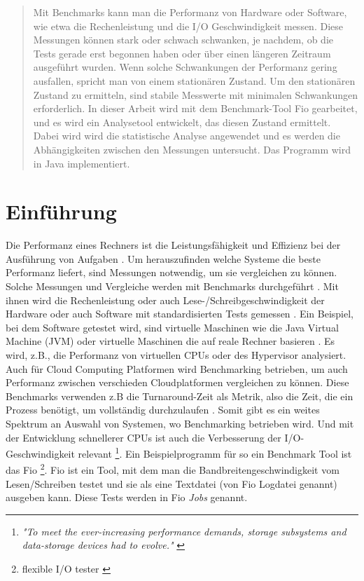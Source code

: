 \documentclass{article}
\begin{document}
\begin{abstract}
Mit Benchmarks kann man die Performanz von Hardware oder Software, wie etwa die Rechenleistung und die I/O Geschwindigkeit messen. 
Diese Messungen können stark oder schwach schwanken, je nachdem, ob die Tests gerade erst begonnen haben oder über einen längeren Zeitraum ausgeführt wurden.
Wenn solche Schwankungen der Performanz gering ausfallen, spricht man von einem stationären Zustand.
Um den stationären Zustand zu ermitteln, sind stabile Messwerte mit minimalen Schwankungen erforderlich. In dieser Arbeit wird mit dem Benchmark-Tool Fio gearbeitet, und es wird ein Analysetool entwickelt, das diesen Zustand ermittelt. Dabei wird wird die statistische Analyse angewendet und es werden die Abhängigkeiten zwischen den Messungen untersucht. Das Programm wird in Java implementiert.
\end{abstract}

\newpage
\section{Einführung}
Die Performanz eines Rechners ist die Leistungsfähigkeit und Effizienz bei der Ausführung von Aufgaben \cite{Delst}. Um herauszufinden welche Systeme die beste Performanz liefert, sind Messungen notwendig, um sie vergleichen zu können. Solche Messungen und Vergleiche werden mit Benchmarks durchgeführt \cite{Sabetta2008}.
Mit ihnen wird die Rechenleistung oder auch Lese-/Schreibgeschwindigkeit der Hardware oder auch Software mit standardisierten Tests gemessen \cite{benchmarkingBruno2014}. Ein Beispiel, bei dem Software getestet wird, sind virtuelle Maschinen wie die Java Virtual Machine (JVM) \cite{10.1145/1297027.1297033} oder virtuelle Maschinen die auf reale Rechner basieren \cite{9256518}.
Es wird, z.B., die Performanz von virtuellen CPUs oder des Hypervisor analysiert.
Auch für Cloud Computing Platformen wird Benchmarking betrieben, um auch Performanz zwischen verschieden Cloudplatformen vergleichen zu können. Diese Benchmarks verwenden z.B die Turnaround-Zeit als Metrik, also die Zeit, die ein Prozess benötigt, um vollständig durchzulaufen \cite{10.1145/2493123.2462919}.  Somit gibt es ein weites Spektrum an Auswahl von Systemen, wo  Benchmarking betrieben wird.
Und mit der Entwicklung schnellerer CPUs ist auch die Verbesserung der I/O-Geschwindigkeit relevant \footnote{\textit{"To meet the ever-increasing performance demands, storage subsystems and data-storage devices had to evolve."} \cite{analysisNVMeSSD}}.
Ein Beispielprogramm für so ein Benchmark Tool ist das Fio \footnote{flexible I/O tester \cite{axboe2021github}}.
Fio ist ein Tool, mit dem man die Bandbreitengeschwindigkeit vom Lesen/Schreiben testet und sie als eine Textdatei (von Fio Logdatei genannt) ausgeben kann. Diese Tests werden in Fio \textit{Jobs} genannt.
\end{document}

